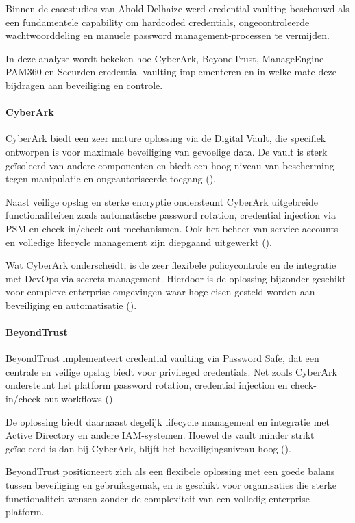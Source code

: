 Binnen de casestudies van Ahold Delhaize werd credential vaulting beschouwd als een fundamentele capability om hardcoded credentials, ongecontroleerde wachtwoorddeling en manuele password management-processen te vermijden.

In deze analyse wordt bekeken hoe CyberArk, BeyondTrust, ManageEngine PAM360 en Securden credential vaulting implementeren en in welke mate deze bijdragen aan beveiliging en controle.

\paragraph{CyberArk}
CyberArk biedt een zeer mature oplossing via de Digital Vault, die specifiek ontworpen is voor maximale beveiliging van gevoelige data. De vault is sterk geïsoleerd van andere componenten en biedt een hoog niveau van bescherming tegen manipulatie en ongeautoriseerde toegang (\cite{cyberark_pam_architecture}).

Naast veilige opslag en sterke encryptie ondersteunt CyberArk uitgebreide functionaliteiten zoals automatische password rotation, credential injection via PSM en check-in/check-out mechanismen. Ook het beheer van service accounts en volledige lifecycle management zijn diepgaand uitgewerkt (\cite{cyberark_psm,cyberark_pam_architecture}).

Wat CyberArk onderscheidt, is de zeer flexibele policycontrole en de integratie met DevOps via secrets management. Hierdoor is de oplossing bijzonder geschikt voor complexe enterprise-omgevingen waar hoge eisen gesteld worden aan beveiliging en automatisatie (\cite{cyberark_pam_architecture}).

\paragraph{BeyondTrust}
BeyondTrust implementeert credential vaulting via Password Safe, dat een centrale en veilige opslag biedt voor privileged credentials. Net zoals CyberArk ondersteunt het platform password rotation, credential injection en check-in/check-out workflows (\cite{beyondtrust_passwordsafe}).

De oplossing biedt daarnaast degelijk lifecycle management en integratie met Active Directory en andere IAM-systemen. Hoewel de vault minder strikt geïsoleerd is dan bij CyberArk, blijft het beveiligingsniveau hoog (\cite{beyondtrust_passwordsafe,beyondtrust_authentication}).

BeyondTrust positioneert zich als een flexibele oplossing met een goede balans tussen beveiliging en gebruiksgemak, en is geschikt voor organisaties die sterke functionaliteit wensen zonder de complexiteit van een volledig enterprise-platform.


